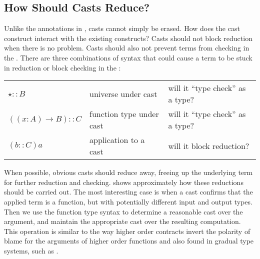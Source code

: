 \subsection{How Should Casts Reduce?}

Unlike the annotations in , casts cannot simply be erased. 
How does the cast construct interact with the existing constructs?
Casts should not block reduction when there is no problem.
Casts should also not prevent terms from checking in the \csys{}.
There are three combinations of syntax that could cause a term to be stuck in reduction or block checking in the \csys{}:

\begin{tabular}{lll}
$\star::B$ & universe under cast & will it ``type check'' as a type?\tabularnewline
$\left(\left(x:A\right)\rightarrow B\right)::C$ & function type under cast & will it ``type check'' as a type?\tabularnewline
$\left(b::C\right)a$ & application to a cast & will it block reduction?\tabularnewline
\end{tabular}

When possible, obvious casts should reduce away, freeing up the underlying term for further reduction and checking.
 shows approximately how these reductions should be carried out.
The most interesting case is when a cast confirms that the applied term is a function, but with potentially different input and output types.
Then we use the function type syntax to determine a reasonable cast over the argument, and maintain the appropriate cast over the resulting computation.
This operation is similar to the way higher order contracts invert the polarity of blame for the arguments of higher order functions \cite{10.1145/581478.581484} and also found in gradual type systems, such as \cite{10.1007/978-3-642-00590-9_1}.

